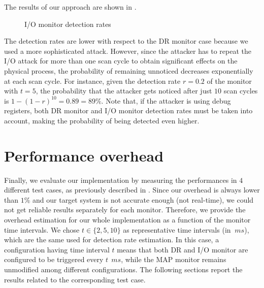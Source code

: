 The results of our approach are shown in .
\begin{figure}[h]
\centering
{}
\caption{I/O monitor detection rates}
\label{fig:io-rates}
\end{figure}
The detection rates are lower with respect to the DR monitor case because we used a more sophisticated attack.
However, since the attacker has to repeat the I/O attack for more than one scan cycle to obtain significant effects on the physical process,
the probability of remaining unnoticed decreases exponentially at each scan cycle.
For instance, given the detection rate $r = 0.2$ of the monitor with $t = 5$, the probability that the attacker
gets noticed after just $10$ scan cycles is $1 - (1 - r)^{10} = 0.89 = 89\%$.
Note that, if the attacker is using debug registers, both DR monitor and I/O monitor detection rates must be taken into account,
making the probability of being detected even higher.


\section{Performance overhead}
\label{sec:overhead}

Finally, we evaluate our implementation by measuring the performances in $4$ different test cases, as previously described in .
Since our overhead is always lower than $1\%$ and our target system is not accurate enough (not real-time),
we could not get reliable results separately for each monitor. Therefore, we provide the overhead estimation for our whole implementation as a function of the monitor time intervals.
We chose $t \in \{2,5,10\}$ as representative time intervals (in $\SI{}{ms}$), which are the same used for detection rate estimation.
In this case, a configuration having time interval $t$ means that both DR and I/O monitor are configured to be triggered every $t~\SI{}{ms}$,
while the MAP monitor remains unmodified among different configurations. The following sections report the results related to the corresponding test case.

